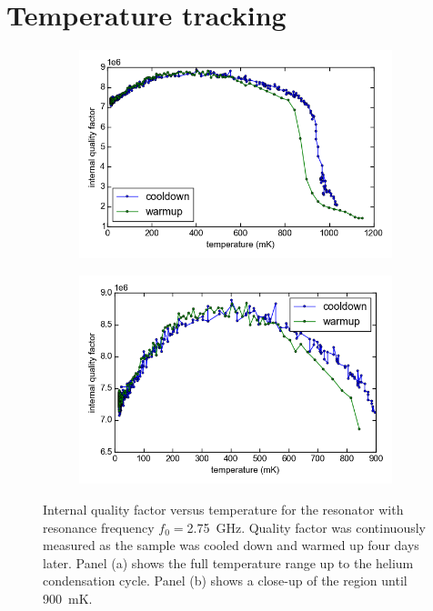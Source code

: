 \section{Temperature tracking}
\label{resonator:results:temperature_tracking}
\begin{figure}[h]
    \centering
    \begin{subfigure}[b]{.49\textwidth}
        \label{fig:temperature_tracking_Qi_drop}
        \includegraphics[width=\textwidth]{Figures/DRIE/Temperature tracking drop - Qi vs T.png}
    \end{subfigure}
    \begin{subfigure}[b]{.49\textwidth}
        \label{fig:temperature_tracking_Qi_nodrop}
        \includegraphics[width=\textwidth]{Figures/DRIE/Temperature tracking - no drop - Qi vs T.png}
    \end{subfigure}
    \caption{Internal quality factor versus temperature for the resonator with resonance frequency $f_0= $\SI{2.75}{\giga \hertz}. Quality factor was continuously measured as the sample was cooled down and warmed up four days later. Panel (a) shows the full temperature range up to the helium condensation cycle. Panel (b) shows a close-up of the region until \SI{900}{\milli \kelvin}.}
    \label{fig:temperature_tracking_Qi}
\end{figure}

